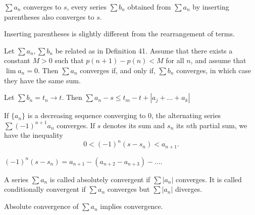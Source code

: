 \documentclass[10pt,a4paper]{book}
\begin{document}
\begin{Thm}
$ \sum a_n$ converges to $s$,  every series $\sum b_n$ obtained from $\sum a_n$ by inserting parentheses also converges to $s$.
\end{Thm}
\PP Inserting parentheses is slightly different from the rearrangement of terms.

\begin{Thm}
Let $\sum a_n, \sum b_n$ be related as in Definition 41. Assume that there
exists a constant $M > 0$ such that $p(n + 1) - p(n) < M$ for all $n$, and assume that $\lim a_n = 0$. Then $\sum a_n$ converges if, and only if, $\sum b_n$ converges, in which case they have the same sum.
\end{Thm}
\PP Let $\sum b_n = t_n \rightarrow t$. Then $\sum a_n - s \leq  t_m - t + |a_j + \dots + a_k|$


\begin{Thm}
 If $\{a_n\}$ is a decreasing sequence converging to $0$, the alternating
series $\sum (-1)^{n+1}a_n$ converges. If $s$ denotes its sum and $s_n$ its $n$th partial sum, we have the inequality
$$0 < (-1)^n(s - s_n) < a_{n+1}.$$
\end{Thm}
\PP $(-1)^n(s-s_n) = a_{n+1} - (a_{n+2} - a_{n+3}) - \dots $.
\begin{deff}
A series $\sum a_n$ is called absolutely convergent if $\sum |a_n|$ converges. It is called conditionally convergent if $\sum a_n$ converges but $\sum |a_n|$ diverges.
\end{deff}

\begin{Thm}
Absolute convergence of $\sum a_n$ implies convergence.
\end{Thm}
\end{document}
